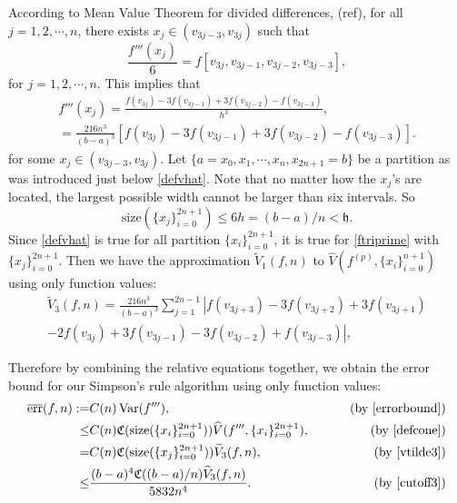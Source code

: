 \documentclass{iitthesis}
\DeclareMathOperator{\Var}{Var}
\theoremstyle{definition}
\theoremstyle{remark}
\begin{document}


According to Mean Value Theorem for divided differences, (ref), for all $j=1,2,\cdots,n$, there exists $x_j\in (v_{3j-3},v_{3j})$ such that
\begin{equation*}
    \frac{f'''(x_j)}{6}=f[v_{3j},v_{3j-1},v_{3j-2},v_{3j-3}],
\end{equation*}
for $j = 1, 2, \cdots, n.$ This implies that
\begin{multline}\label{ftriprime}
  f'''(x_j)=\frac{f(v_{3j})-3f(v_{3j-1})+3f(v_{3j-2})-f(v_{3j-3})}{h^3},\\=\frac{216n^3}{(b-a)^3}[f(v_{3j})-3f(v_{3j-1})+3f(v_{3j-2})-f(v_{3j-3})].
\end{multline}
for some $x_j\in (v_{3j-3},v_{3j})$. Let $\{a=x_{0}, x_{1},\cdots,x_{n},x_{2n+1}=b\}$ be a partition as was introduced just below \eqref{defvhat}. Note that no matter how the $x_j$'s are located, the largest possible width cannot be larger than six intervals. So
\begin{equation}\label{cutoff3}
    \text{size}(\{x_j\}_{i=0}^{2n+1})\leq 6h=(b-a)/n<\mathfrak{h}.
\end{equation}
Since \eqref{defvhat} is true for all partition $\{x_i\}_{i=0}^{2n+1}$, it is true for \eqref{ftriprime} with $\{x_j\}_{i=0}^{2n+1}$. Then we have the approximation $\widetilde{V}_1(f,n)$ to $\widehat{V}(f^{(p)},\{x_i\}_{i=0}^{n+1})$ using only function values:
\begin{multline}\label{vtilde3}
\widetilde{V}_3(f,n)=\frac{216n^3}{(b-a)^3}\sum_{j=1}^{2n-1}\left|f(v_{3j+3})-3f(v_{3j+2})+3f(v_{3j+1})\right.\\\left.-2f(v_{3j})+3f(v_{3j-1})-3f(v_{3j-2})+f(v_{3j-3})\right|,
\end{multline}

Therefore by combining the relative equations together, we obtain the error bound for our Simpson's rule algorithm using only function values:
\begin{align*}
\overline{\text{err}}(f,n):=&C(n)\Var(f'''),\qquad &\text{ (by \eqref{errorbound})}\\
\leq & C(n)\mathfrak{C}(\text{size}(\{x_i\}_{i=0}^{2n+1}))\widehat{V}(f''',\{x_i\}_{i=0}^{2n+1}), \qquad &\text{ (by \eqref{defcone})}\\
=& C(n)\mathfrak{C}(\text{size}(\{x_j\}_{i=0}^{2n+1}))\widetilde{V}_3(f,n), \qquad &\text{ (by \eqref{vtilde3})}\\
  \leq & \frac{(b-a)^4\mathfrak{C}((b-a)/n)\widetilde{V}_3(f,n)}{5832n^4}.\qquad &\text{ (by \eqref{cutoff3})}
\end{align*}
\end{document}
